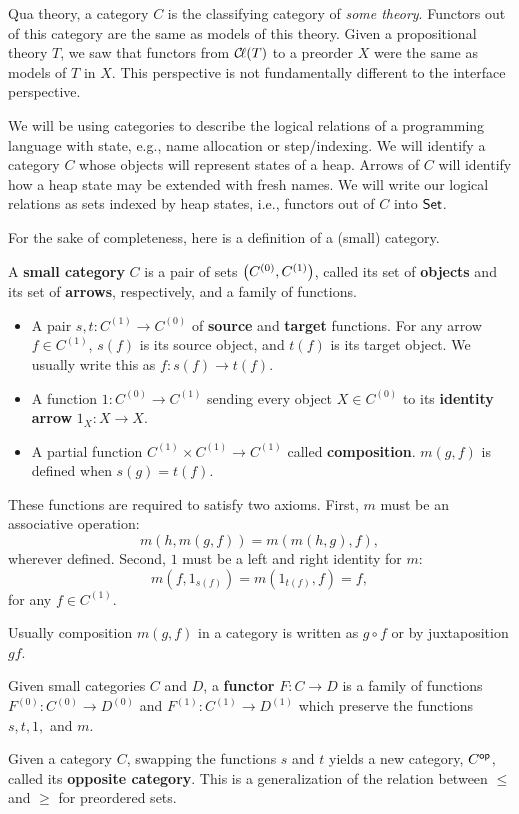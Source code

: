 \documentclass{../thesis-note}
\begin{document}
Qua theory, a category \(C\) is the classifying category of
\emph{some theory}. Functors out of this category are the same as models of this
theory. Given a propositional theory \(T\), we saw that functors from \({\mathcal{C}\kern-.15em\ell}(T)\)
to a preorder \(X\) were the same as models of \(T\) in \(X\). This perspective
is not fundamentally different to the interface perspective.

We will be using categories to describe the logical relations of a programming
language with state, e.g., name allocation or step\-/indexing. We will identify
a category \(C\) whose objects will represent states of a heap. Arrows of \(C\)
will identify how a heap state may be extended with fresh names. We will write
our logical relations as sets indexed by heap states, i.e., functors out of
\(C\) into \({\mathsf{Set}}\).

For the sake of completeness, here is a definition of a (small) category.
\begin{definition}
  A \textbf{small category} \(C\) is a pair of sets \({\left(C^{(0)},
    C^{(1)}\right)}\), called its set of \textbf{objects} and its set of
  \textbf{arrows}, respectively, and a family of functions.
  \begin{itemize}
  \item A pair \(s,t : C^{(1)} \to C^{(0)}\) of \textbf{source} and
    \textbf{target} functions. For any arrow \(f \in C^{(1)}\), \(s(f)\) is its
    source object, and \(t(f)\) is its target object. We usually write this as
    \(f : s(f) \to t(f)\).
  \item A function \(1: C^{(0)} \to C^{(1)}\) sending every object \(X \in
    C^{(0)}\) to its \textbf{identity arrow} \(1_X : X \to X\).
  \item A partial function \(C^{(1)} \times C^{(1)} \to C^{(1)}\) called
    \textbf{composition}. \(m(g,f)\) is defined when \(s(g) = t(f)\).
  \end{itemize}
  These functions are required to satisfy two axioms. First, \(m\) must be an
  associative operation:
  \[%
    m(h,m(g,f)) = m(m(h,g),f),
  \]%
  wherever defined. Second, \(1\) must be a left and right identity for \(m\):
  \[%
    m(f,1_{s(f)}) = m(1_{t(f)}, f) = f,
  \]%
  for any \(f \in C^{(1)}\).
\end{definition}
Usually composition \(m(g,f)\) in a category is written as \(g\circ f\) or by
juxtaposition \(gf\).
\begin{definition}
  Given small categories \(C\) and \(D\), a \textbf{functor} \(F: C \to D\) is a
  family of functions \(F^{(0)} : C^{(0)} \to D^{(0)}\) and \(F^{(1)} : C^{(1)}
  \to D^{(1)}\) which preserve the functions \(s,t,1,\) and \(m\).
\end{definition}
Given a category \(C\), swapping the functions \(s\) and \(t\) yields a new
category, \(C^{\mathsf{op}}\), called its \textbf{opposite category}. This is a
generalization of the relation between \(\leq\) and \(\geq\) for preordered
sets.
\end{document}
